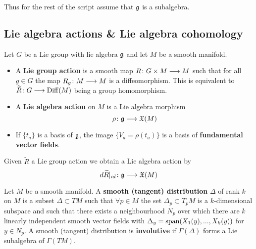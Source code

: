 Thus for the rest of the script assume that $\mathfrak{g}$ is a subalgebra.


\subsection{Lie algebra actions \& Lie algebra cohomology}

\begin{definition}
  Let $G$ be a Lie group with lie algebra $\mathfrak{g}$ and let $M$ be a smooth manifold.
  \begin{itemize}
    \item A  \textbf{Lie group action} is a smooth map $R\colon G \times M \longrightarrow M$ such that for all $g \in G$ the map $R_g \colon M \longrightarrow M$ is a diffeomorphism. This is equivalent to $\widetilde{R} \colon G \longrightarrow \operatorname{Diff}(M)$ being a group homomorphism.

    \item A \textbf{Lie algebra action} on $M$ is a Lie algebra morphism
    \begin{equation}\rho \colon \mathfrak{g} \longrightarrow \mathfrak{X}(M) \end{equation}

    \item If $\{t_a\}$ is a basis of $\mathfrak{g}$, the image $\{V_a = \rho(t_a)\}$ is a basis of \textbf{fundamental vector fields}.
  \end{itemize}
\end{definition}

\begin{example}
  Given $\widetilde{R}$ a Lie group action we obtain a Lie algebra action by
  \begin{equation}d \widetilde{R} |_{id} \colon \mathfrak{g} \longrightarrow \mathfrak{X}(M) \end{equation}
\end{example}

\begin{definition}
  Let $M$ be a smooth manifold. A \textbf{smooth (tangent) distribution} $\Delta$ of rank $k$ on $M$ is a subset $\Delta \subset TM$ such that $\forall p \in M$ the set $\Delta_p \subset T_p M$ is a $k$-dimensional subspace and such that there exists a neighbourhood $N_p$ over which there are $k$ linearly independent smooth vector fields with $\Delta_y = \operatorname{span}(X_1(y), ..., X_k(y))$ for $y \in N_p$. A smooth (tangent) distribution is \textbf{involutive} if $\Gamma(\Delta)$ forms a Lie subalgebra of $\Gamma(TM)$.
\end{definition}

